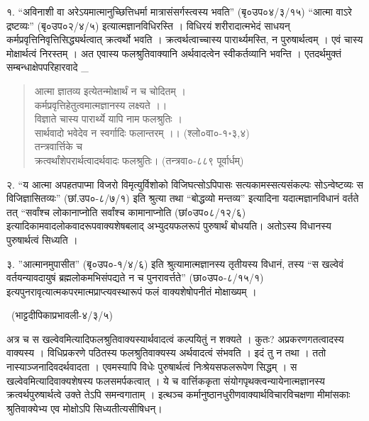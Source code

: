 १. “अविनाशी वा अरेऽयमात्मानुच्छित्तिधर्मा मात्रासंसर्गस्त्वस्य भवति” (बृ०उप०४/३/१५) “आत्मा वाऽरे द्रष्टव्यः” (बृ०उप०२/४/५) इत्यात्मज्ञानविधिरस्ति । विधिरयं शरीरादात्मभेदं साधयन् कर्मप्रवृत्तिनिवृत्तिसिद्ध्यर्थत्वात् क्रत्वर्थो भवति । क्रत्वर्थत्वाच्चास्य पारार्थ्यमस्ति, न पुरुषार्थत्वम् । एवं चास्य मोक्षार्थत्वं निरस्तम् । अत एवास्य फलश्रुतिवाक्यानि अर्थवादत्वेन स्वीकर्तव्यानि भवन्ति । एतदर्थमुक्तं सम्बन्धाक्षेपपरिहारवादे _
\begin{verse}
आत्मा ज्ञातव्य इत्येतन्मोक्षार्थं न च चोदितम् ।\\
कर्मप्रवृत्तिहेतुत्वमात्मज्ञानस्य लक्ष्यते ।।\\
विज्ञाते चास्य पारार्थ्ये यापि नाम फलश्रुतिः ।\\
सार्थवादो भवेदेव न स्वर्गादिः फलान्तरम् ।। (श्लो०वा०-१॰३,४)\\
तन्त्रवार्त्तिके च\\
क्रत्वर्थांशेपरार्थत्वादर्थवादः फलश्रुतिः। (तन्त्रवा०-८८९ पूर्वार्धम्)
\end{verse}

२. “य आत्मा अपहतपाप्मा विजरो विमृत्युर्विशोको विजिघत्सोऽपिपासः सत्यकामस्सत्यसंकल्पः सोऽन्वेष्टव्यः स विजिज्ञासितव्यः” (छां.उप०-८/७/१) इति श्रुत्या तथा “बोद्धव्यो मन्तव्य” इत्यादिना यदात्मज्ञानविधानं वर्तते तत् “सर्वांश्च लोकानाप्नोति सर्वांश्च कामानाप्नोति (छां०उप०८/१२/६) इत्यादिकामवादलोकवादरूपवाक्यशेषबलाद् अभ्युदयफलरूपं पुरुषार्थं बोधयति। अतोऽस्य विधानस्य पुरुषार्थत्वं सिध्यति ।

३. ”आत्मानमुपासीत” (बृ०उप०-१/४/६) इति श्रुत्यामात्मज्ञानस्य तृतीयस्य विधानं, तस्य “स खल्वेवं वर्तयन्यावदायुषं ब्रह्मलोकमभिसंपद्यते न च पुनरावर्त्तते” (छा०उप०-८/१५/१) इत्यपुनरावृत्यात्मकपरमात्मप्राप्त्यवस्थारूपं फलं वाक्यशेषोपनीतं मोक्षाख्यम् । 

~\hfill (भाट्टदीपिकाप्रभावली-४/३/५) 

अत्र च स खल्वेवमित्यादिफलश्रुतिवाक्यस्यार्थवादत्वं कल्पयितुं न शक्यते । कुतः? अप्रकरणगतत्वादस्य वाक्यस्य । विधिप्रकरणे पठितस्य फलश्रुतिवाक्यस्य अर्थवादत्वं संभवति । इदं तु न तथा । ततो नास्याञ्जनादिवदर्थवादता । एवमस्यापि विधेः पुरुषार्थत्वं निःश्रेयसफलरूपेण सिद्धम् । स खल्वेवमित्यादिवाक्यशेषस्य फलसमर्पकत्वात् । ये च वार्त्तिककृता संयोगपृथक्त्वन्यायेनात्मज्ञानस्य क्रत्वर्थपुरुषार्थत्वे उक्ते तेऽपि समन्वगाताम् । इत्थञ्च कर्मानुष्ठानधुरीणवाक्यार्थविचारविचक्षणा मीमांसकाः श्रुतिवाक्येभ्य एव मोक्षोऽपि सिध्यतीत्यसीषिधन्।

